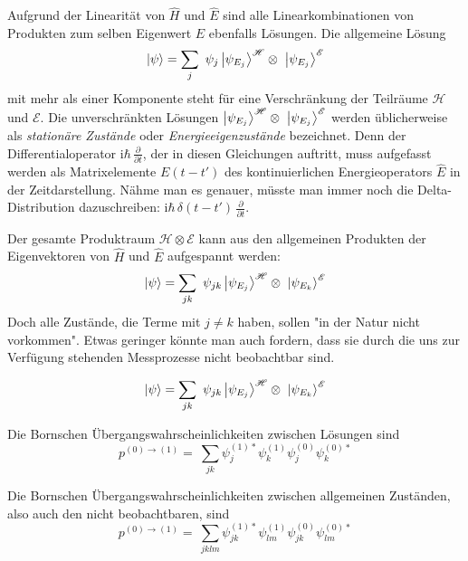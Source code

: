 \documentclass[12pt]{article}
\begin{document}
Aufgrund der Linearität von $\hat{H}$ und $\hat{E}$ sind alle Linearkombinationen von Produkten zum selben Eigenwert $E$ ebenfalls Lösungen. Die allgemeine Lösung
\begin{equation}
\ket{\psi} = \sum_j\ \psi_j \ket{\psi_{E_j}}^{\mathscr{H}} \otimes\ \ket{\psi_{E_j}}^{\mathscr{E}}
\end{equation}
mit mehr als einer Komponente steht für eine Verschränkung der Teilräume $\mathscr{H}$ und $\mathscr{E}$. Die unverschränkten Lösungen $\ket{\psi_{E_j}}^{\mathscr{H}} \otimes\ \ket{\psi_{E_j}}^{\mathscr{E}}$ werden üblicherweise als \emph{stationäre Zustände} oder \emph{Energieeigenzustände} bezeichnet. Denn der Differentialoperator $\mathrm{i}\hbar\,\frac{\partial}{\partial t}$, der in diesen Gleichungen auftritt, muss aufgefasst werden als Matrixelemente $E(t-t')$ des kontinuierlichen Energieoperators $\hat{E}$ in der Zeitdarstellung. Nähme man es genauer, müsste man immer noch die Delta-Distribution dazuschreiben: $\mathrm{i}\hbar\,\delta(t-t')\,\frac{\partial}{\partial t}$.

Der gesamte Produktraum $\mathscr{H} \otimes \mathscr{E}$ kann aus den allgemeinen Produkten der Eigenvektoren von $\hat{H}$ und $\hat{E}$ aufgespannt werden:
\begin{equation}
\ket{\psi} = \sum_{jk}\ \psi_{jk} \ket{\psi_{E_j}}^{\mathscr{H}} \otimes\ \ket{\psi_{E_k}}^{\mathscr{E}}
\end{equation}
Doch alle Zustände, die Terme mit $j \neq k$ haben, sollen "in der Natur nicht vorkommen". Etwas geringer könnte man auch fordern, dass sie durch die uns zur Verfügung stehenden Messprozesse nicht beobachtbar sind.

\begin{equation}
\ket{\psi} = \sum_{jk}\ \psi_{jk} \ket{\psi_{E_j}}^{\mathscr{H}} \otimes\ \ket{\psi_{E_k}}^{\mathscr{E}}
\end{equation}

Die Bornschen Übergangswahrscheinlichkeiten zwischen Lösungen sind
\begin{equation} 
p^{(0)\rightarrow(1)} =\ \sum_{jk} \psi_j^{(1)*}\psi_k^{(1)}\psi_j^{(0)}\psi_k^{(0)*}
\end{equation}

Die Bornschen Übergangswahrscheinlichkeiten zwischen allgemeinen Zuständen, also auch den nicht beobachtbaren, sind
\begin{equation} 
p^{(0)\rightarrow(1)} =\ \sum_{jklm} \psi_{jk}^{(1)*}\psi_{lm}^{(1)}\psi_{jk}^{(0)}\psi_{lm}^{(0)*}
\end{equation}
\end{document}
